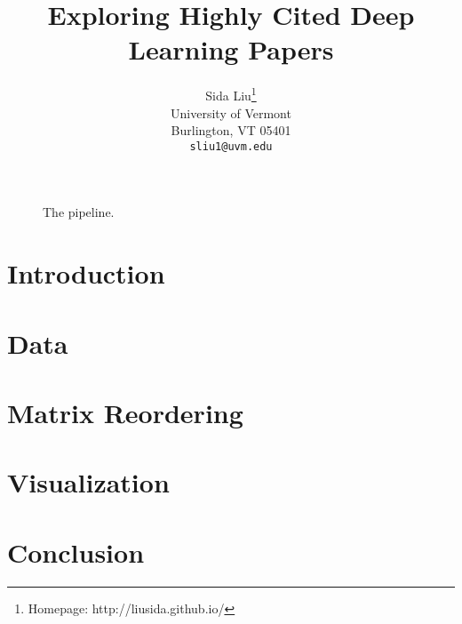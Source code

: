 \documentclass{article}
\title{Exploring Highly Cited Deep Learning Papers}
\author{
  Sida Liu\thanks{Homepage: http://liusida.github.io/} \\
  University of Vermont\\
  Burlington, VT 05401\\
  \texttt{sliu1@uvm.edu} \\

}
\begin{document}
\maketitle

\begin{figure}[h]
  \centering
  \fbox{\rule[-.5cm]{4cm}{4cm} \rule[-.5cm]{4cm}{0cm}}
  \caption{The pipeline.}
  \label{fig:1}
\end{figure}

\begin{abstract}

\end{abstract}



% 

\section{Introduction}


\section{Data}


\section{Matrix Reordering}


\section{Visualization}


\section{Conclusion}


  
\end{document}
